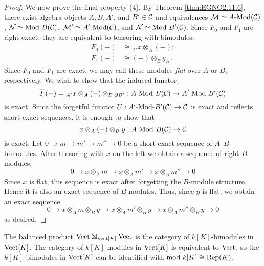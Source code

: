 \documentclass{amsart}
\begin{document}
\begin{proof}
We now prove the final property (4). By Theorem \ref{thm:EGNO2.11.6}, there exist algebra objects $A, B, A'$, and $B' \in \mathcal C$ and equivalences $\cM \simeq \Mod{A}{}(\cC)$, $\cN \simeq \Mod{}{B}(\cC)$, $\cM' \simeq \Mod{A'}{}(\cC)$, and $\cN \simeq \Mod{}{B'}(\cC)$. Since $F_0$ and $F_1$ are right exact, they are equivalent to tensoring with bimodules:
\begin{align*}
	F_0(-) &\cong {}_{A'}x \otimes_A (-); \\
	F_1(-) & \cong (-) \otimes_B y_{B'}.
\end{align*}
Since $F_0$ and $F_1$ are exact, we may call these modules {\em flat} over $A$ or $B$, respectively. We wish to show that the induced functor:
\begin{equation*}
	\overline{F}(-) = {}_{A'}x \otimes_A (-) \otimes_B y_{B'}: \Mod{A}{B}(\cC) \to \Mod{A'}{B'}(\cC)
\end{equation*}
is exact. Since the forgetful functor $U: \Mod{A'}{B'}(\cC) \to \cC$ is exact and reflects short exact sequences, it is enough to show that 
\begin{equation*}
	x \otimes_A (-) \otimes_B y: \Mod{A}{B}(\cC) \to \cC
\end{equation*}
is exact. Let $0 \to m \to m' \to m'' \to 0$ be a short exact sequence of $A$--$B$-bimodules. After tensoring with $x$ on the left we obtain a sequence of right $B$-modules:
\begin{equation*}
	0 \to x \otimes_A m \to x \otimes_A m' \to x \otimes_A {m''} \to 0
\end{equation*}
Since $x$ is flat, this sequence is exact after forgetting the $B$-module structure. Hence it is also an exact sequence of $B$-modules. Thus, since $y$ is flat, we obtain an exact sequence
\begin{equation*}
		0 \to x \otimes_A m \otimes_B y \to x \otimes_A m'\otimes_B y \to x \otimes_A {m''}  \otimes_B y \to 0
\end{equation*}
	as desired. 
\end{proof}

\begin{example}
The balanced product $\mathrm{Vect} \boxtimes_{\mathrm{Vect}[K]} \mathrm{Vect}$ is the category of $k[K]$-bimodules in $\mathrm{Vect}[K]$. The category of $k[K]$-modules in $\mathrm{Vect}[K]$ is equivalent to $\mathrm{Vect}$, so the $k[K]$-bimodules in $\mathrm{Vect}[K]$ can be identified with $\text{mod-}k[K] \cong \mathrm{Rep}(K)$.
\end{example}
\end{document}

